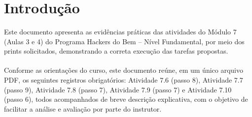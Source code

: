 \section{Introdução}

\paragraph{}
Este documento apresenta as evidências práticas das atividades do Módulo 7
(Aulas 3 e 4) do Programa Hackers do Bem -- Nível Fundamental, por meio dos
prints solicitados, demonstrando a correta execução das tarefas propostas.

\paragraph{}
Conforme as orientações do curso, este documento reúne, em um único arquivo
PDF, os seguintes registros obrigatórios: Atividade 7.6 (passo 8), Atividade
7.7 (passo 9), Atividade 7.8 (passo 7), Atividade 7.9 (passo 7) e Atividade
7.10 (passo 6), todos acompanhados de breve descrição explicativa, com o
objetivo de facilitar a análise e avaliação por parte do instrutor.
